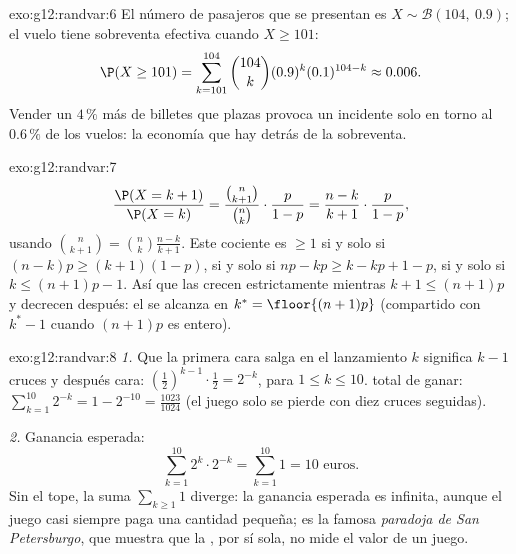 \begin{solution}{exo:g12:randvar:6}
El número de pasajeros que se presentan es $X \sim \mathcal B(104,\ 0.9)$;
el vuelo tiene sobreventa efectiva cuando $X \geq 101$:
\[
\P(X \geq 101) = \sum_{k=101}^{104}\binom{104}{k}(0.9)^k(0.1)^{104-k}
\approx 0.006 .
\]
Vender un $4\,\%$ más de billetes que plazas provoca un incidente solo en
torno al $0.6\,\%$ de los vuelos: la economía que hay detrás de la
sobreventa.
\end{solution}

\begin{solution}{exo:g12:randvar:7}
\[
\frac{\P(X = k+1)}{\P(X = k)}
= \frac{\binom{n}{k+1}}{\binom nk}\cdot\frac{p}{1-p}
= \frac{n - k}{k + 1}\cdot\frac{p}{1-p},
\]
usando $\binom{n}{k+1} = \binom nk \frac{n-k}{k+1}$. Este cociente es
$\geq 1$ si y solo si $(n-k)p \geq (k+1)(1-p)$, si y solo si
$np - k p \geq k - kp + 1 - p$, si y solo si $k \leq (n+1)p - 1$. Así que
las  crecen estrictamente mientras $k + 1 \leq (n+1)p$ y
decrecen después: el  se alcanza en $k^* = \floor{(n+1)p}$
(compartido con $k^* - 1$ cuando $(n+1)p$ es entero).
\end{solution}

\begin{solution}{exo:g12:randvar:8}
\emph{1.} Que la primera cara salga en el lanzamiento $k$ significa $k-1$
cruces y después cara: 
$\left(\frac12\right)^{k-1}\cdot\frac12 = 2^{-k}$, para
$1 \leq k \leq 10$.  total de ganar:
$\sum_{k=1}^{10} 2^{-k} = 1 - 2^{-10} = \frac{1023}{1024}$ (el juego solo
se pierde con diez cruces seguidas).

\emph{2.} Ganancia esperada:
\[
\sum_{k=1}^{10} 2^k \cdot 2^{-k} = \sum_{k=1}^{10} 1 = 10 \text{ euros}.
\]
Sin el tope, la suma $\sum_{k\geq1} 1$ diverge: la ganancia esperada es
infinita, aunque el juego casi siempre paga una cantidad pequeña; es la
famosa \emph{paradoja de San Petersburgo}, que muestra que la ,
por sí sola, no mide el valor de un juego.
\end{solution}

